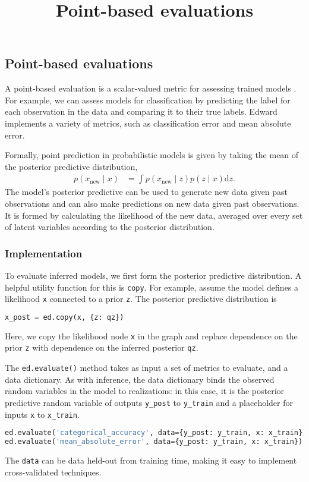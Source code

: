 \title{Point-based evaluations}

\subsection{Point-based evaluations}

A point-based evaluation is a scalar-valued metric for assessing
trained models \citep{gneiting2007strictly}.
For example, we can assess models for classification
by predicting the label for each observation in the data and comparing
it to their true labels. Edward implements a variety of metrics, such
as classification error and mean absolute error.

Formally, point prediction in probabilistic models is given by
taking the mean of the posterior predictive distribution,
\begin{align*}
  p(x_\text{new} \mid x)
  &=
  \int
  p(x_\text{new} \mid z)
  p(z \mid x)
  \text{d} z.
\end{align*}
The model's posterior predictive can be used to generate new data
given past observations and can also make predictions on new data
given past observations.
It is formed by calculating the likelihood of the new data, averaged
over every set of latent variables according to the posterior
distribution.

\subsubsection{Implementation}

To evaluate inferred models, we first form the posterior
predictive distribution. A helpful utility function for this is
\texttt{copy}. For example,
assume the model defines a likelihood \texttt{x} connected to a prior
\texttt{z}. The posterior predictive distribution is
\begin{lstlisting}[language=Python]
x_post = ed.copy(x, {z: qz})
\end{lstlisting}
Here, we copy the likelihood node \texttt{x} in the graph and replace dependence
on the prior \texttt{z} with dependence on the inferred posterior \texttt{qz}.

The \texttt{ed.evaluate()} method takes as input a set of metrics to
evaluate, and a data dictionary. As with inference, the data dictionary binds the
observed random variables in the model to realizations: in this case,
it is the posterior predictive random variable of outputs \texttt{y_post} to
\texttt{y_train} and a placeholder for inputs \texttt{x} to
\texttt{x_train}.
\begin{lstlisting}[language=Python]
ed.evaluate('categorical_accuracy', data={y_post: y_train, x: x_train})
ed.evaluate('mean_absolute_error', data={y_post: y_train, x: x_train})
\end{lstlisting}
The \texttt{data} can be data held-out from training time, making it
easy to implement cross-validated techniques.

